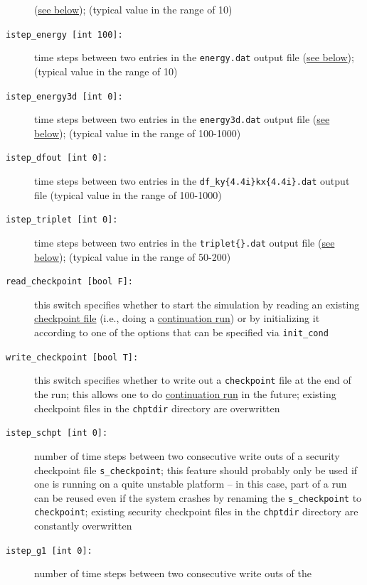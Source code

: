 \documentclass[12pt]{article}
\begin{document}
\begin{description}
(\hyperref[subsec:neoclass-file]{see below});
(typical value in the range of 10)
\item[\hypertarget{istep_energy}{\tt istep\_energy [int 100]:}] time steps between two entries in the \texttt{energy.dat} output file
(\hyperref[subsec:energy-file]{see below});
(typical value in the range of 10)
\item[\hypertarget{istep_energy3d}{\tt istep\_energy3d [int 0]:}] time
steps between two entries in the \texttt{energy3d.dat} output file
(\hyperref[subsec:energy-file]{see below});
(typical value in the range of 100-1000)
\item[\hypertarget{istep_dfout}{\tt istep\_dfout [int 0]:}] time
steps between two entries in the \texttt{df\_ky\{4.4i\}kx\{4.4i\}.dat} output file
(typical value in the range of 100-1000)
\item[\hypertarget{istep_triplet}{\tt istep\_triplet [int 0]:}] time
steps between two entries in the \texttt{triplet\{\}.dat} output file
(\hyperref[subsec:triplet-file]{see below});
(typical value in the range of 50-200)
\item[\hypertarget{read_checkpoint}{\tt read\_checkpoint [bool F]:}] this switch specifies whether to start the simulation by
reading an existing \hyperref[subsec:chpt-files]{checkpoint file}
(i.e., doing a \hyperref[subsubsec:continue_sim]{continuation run}) or by initializing it according
to one of the options that can be specified via \texttt{init\_cond}
\item[\texttt{write\_checkpoint [bool T]:}] this switch specifies whether to write out a {\tt checkpoint}
file at the end of the run; this allows one to do \hyperref[subsubsec:continue_sim]{continuation run} in the future;
existing checkpoint files in the \texttt{chptdir} directory are overwritten
\item[\texttt{istep\_schpt [int 0]:}] number of time steps between two consecutive write outs of a
security checkpoint file {\tt s\_checkpoint}; this feature should probably only be used if one is
running on a quite unstable platform -- in this case, part of a run can be reused even if the system
crashes by renaming the {\tt s\_checkpoint} to {\tt checkpoint}; existing security checkpoint files
in the \texttt{chptdir} directory are constantly overwritten
\item[\texttt{istep\_g1 [int 0]:}] number of time steps between two consecutive write outs of the

\end{description}
\end{document}
